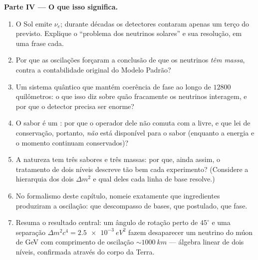 \begin{problem}
\medskip\noindent\textbf{Parte IV --- O que isso significa.}
\begin{enumerate}[resume]
  \item O Sol emite $\nu_e$; durante décadas os detectores contaram
        apenas um terço do previsto. Explique o ``problema dos
        neutrinos solares'' e sua resolução, em uma frase cada.
  \item Por que as oscilações forçaram a conclusão de que os
        neutrinos \emph{têm massa}, contra a contabilidade original do
        Modelo Padrão?
  \item Um sistema quântico que mantém coerência de fase ao longo de
        $12800$ quilômetros: o que isso diz sobre quão fracamente os
        neutrinos interagem, e por que o detector precisa ser enorme?
  \item O sabor é um : por que o operador dele não comuta
        com a  livre, e que lei de conservação, portanto,
        \emph{não} está disponível para o sabor (enquanto a energia e
        o momento continuam conservados)?
  \item A natureza tem três sabores e três massas: por que, ainda
        assim, o tratamento de dois níveis descreve tão bem cada
        experimento? (Considere a hierarquia dos dois $\Delta m^2$ e
        qual deles cada linha de base resolve.)
  \item No formalismo deste capítulo, nomeie exatamente que
        ingredientes produziram a oscilação: que descompasso de
        bases, que postulado, que fase.
  \item Resuma o resultado central: um ângulo de rotação perto de
        $45^\circ$ e uma separação $\Delta m^2c^4 =
        \qty{2.5e-3}{eV^2}$ fazem desaparecer um neutrino do múon de
        GeV com comprimento de oscilação $\sim\qty{1000}{km}$ ---
        álgebra linear de dois níveis, confirmada através do corpo da
        Terra.
\end{enumerate}
\end{problem}
